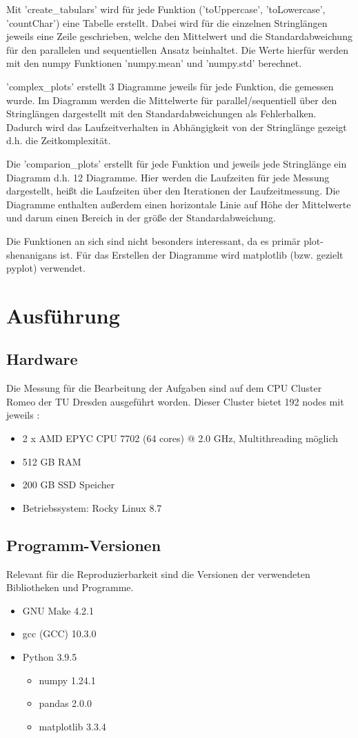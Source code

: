 \documentclass[plainarticle,zihtitle,german,final,hyperref,utf8]{zihpub}
\begin{document}
Mit 'create\_tabulars' wird für jede Funktion ('toUppercase', 'toLowercase', 'countChar') eine Tabelle erstellt. Dabei wird für die einzelnen Stringlängen jeweils eine Zeile geschrieben, welche den Mittelwert und die Standardabweichung für den parallelen und sequentiellen Ansatz beinhaltet. Die Werte hierfür werden mit den numpy Funktionen 'numpy.mean' und 'numpy.std' berechnet.

'complex\_plots' erstellt 3 Diagramme jeweils für jede Funktion, die gemessen wurde. Im Diagramm werden die Mittelwerte für parallel/sequentiell über den Stringlängen dargestellt mit den Standardabweichungen als Fehlerbalken. Dadurch wird das Laufzeitverhalten in Abhängigkeit von der Stringlänge gezeigt d.h. die Zeitkomplexität.

Die 'comparion\_plots' erstellt für jede Funktion und jeweils jede Stringlänge ein Diagramm d.h. 12 Diagramme.
Hier werden die Laufzeiten für jede Messung dargestellt, heißt die Laufzeiten über den Iterationen der Laufzeitmessung. Die Diagramme enthalten außerdem einen horizontale Linie auf Höhe der Mittelwerte und darum einen Bereich in der größe der Standardabweichung.

Die Funktionen an sich sind nicht besonders interessant, da es primär plot-shenanigans ist. Für das Erstellen der Diagramme wird matplotlib (bzw. gezielt pyplot) verwendet.

\section{Ausführung}
\subsection{Hardware}
Die Messung für die Bearbeitung der Aufgaben sind auf dem CPU Cluster Romeo der TU Dresden ausgeführt worden. Dieser Cluster bietet 192 nodes mit jeweils \cite{hpc_compendium}:
\begin{itemize}
\item 2 x AMD EPYC CPU 7702 (64 cores) @ 2.0 GHz, Multithreading möglich
\item 512 GB RAM
\item 200 GB SSD Speicher
\item Betriebssystem: Rocky Linux 8.7
\end{itemize}

\subsection{Programm-Versionen}
Relevant für die Reproduzierbarkeit sind die Versionen der verwendeten Bibliotheken und Programme.
\begin{itemize}
	\item GNU Make 4.2.1
	\item gcc (GCC) 10.3.0
	\item Python 3.9.5
	\begin{itemize}
		\item numpy 1.24.1
		\item pandas 2.0.0
		\item matplotlib 3.3.4
	\end{itemize}
\end{itemize}
\end{document}

